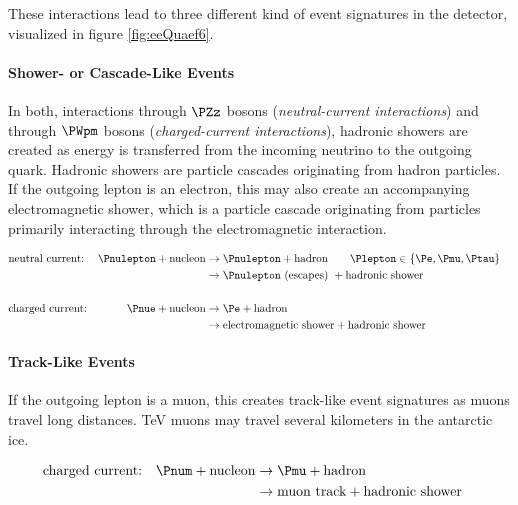 These interactions lead to three different kind of event signatures in the \icecube detector, visualized in figure \ref{fig:eeQuaef6}.

\paragraph{Shower- or Cascade-Like Events}
In both, interactions through $\PZz$ bosons (\textit{neutral-current interactions}) and through $\PWpm$ bosons (\textit{charged-current interactions}), hadronic showers are created as energy is transferred from the incoming neutrino to the outgoing quark. Hadronic showers are particle cascades originating from hadron particles. If the outgoing lepton is an electron, this may also create an accompanying electromagnetic shower, which is a particle cascade originating from particles primarily interacting through the electromagnetic interaction. \cite{energyreco}

\begin{align*}
  & \text{neutral current:} & \Pnulepton + \text{nucleon} & \rightarrow \Pnulepton + \text{hadron} \ \ \ \ \ \ \Plepton \in \{ \Pe, \Pmu, \Ptau \}                             & \\
  &                         &                             & \rightarrow \Pnulepton \text{ (escapes) } + \text{hadronic shower}  & \\ \\
  & \text{charged current:} & \Pnue + \text{nucleon}      & \rightarrow \Pe + \text{hadron}                                     & \\
  &                         &                             & \rightarrow \text{electromagnetic shower} + \text{hadronic shower}  & \\
\end{align*}

\paragraph{Track-Like Events}
If the outgoing lepton is a muon, this creates track-like event signatures as muons travel long distances. TeV muons may travel several kilometers in the antarctic ice. \cite{skysearch, mmc}

\begin{align*}
  & \text{charged current:} & \Pnum + \text{nucleon}      & \rightarrow \Pmu + \text{hadron}                                    & \\
  &                         &                             & \rightarrow \text{muon track} + \text{hadronic shower}              & \\
\end{align*}

